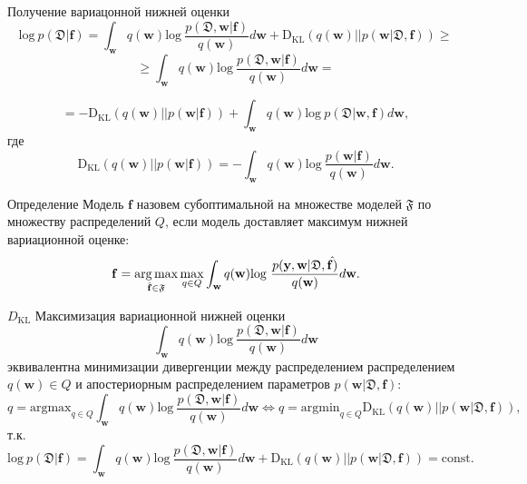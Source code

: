 \documentclass[10pt,pdf,utf8,russian,aspectratio=169]{beamer}
\DeclareMathOperator*{\argmax}{arg\,max}
\begin{document}
\begin{frame}{Получение вариацонной нижней оценки}
$$
\text{log}~p(\mathfrak{D}| \mathbf{f})  = \int_{\mathbf{w}} q(\mathbf{w})\text{log}~\frac{p(\mathfrak{D},\mathbf{w}|\mathbf{f})}{q(\mathbf{w})}d\mathbf{w} + \text{D}_\text{KL}  (q(\mathbf{w})||p(\mathbf{w}| \mathfrak{D}, \mathbf{f})) \geq	
$$
$$
\geq \int_{\mathbf{w}} q(\mathbf{w})\text{log}~\frac{p(\mathfrak{D},\mathbf{w}|\mathbf{f})}{q(\mathbf{w})}d\mathbf{w} =
$$

$$
= -\text{D}_\text{KL} (q(\mathbf{w})||p(\mathbf{w}|\mathbf{f})) + \int_{\mathbf{w}} q(\mathbf{w})\text{log}~{p(\mathfrak{D}|\mathbf{w},\mathbf{f})} d \mathbf{w},
$$
где $$\text{D}_\text{KL}(q(\mathbf{w})||p(\mathbf{w} |\mathbf{f})) = -\int_{\mathbf{w}} q(\mathbf{w})\text{log}~\frac{p(\mathbf{w} | \mathbf{f})}{q(\mathbf{w})}d\mathbf{w}.$$
\begin{block}{Определение} Модель $\mathbf{f}$ назовем субоптимальной на множестве моделей $\mathfrak{F}$  по множеству распределений ${Q}$, если модель доставляет максимум нижней вариационной оценке:
\[
\label{eq:elbo2}
	\mathbf{f} = \argmax_{\hat{\mathbf{f}} \in \mathfrak{F}}\max_{q \in {Q}}\int_{\mathbf{w}} q(\mathbf{w})\textnormal{log}~\frac{p(\mathbf{y},\mathbf{w}|\mathfrak{D},\hat{\mathbf{f})}}{q(\mathbf{w})}d\mathbf{w}.
\]
\end{block}


\end{frame}

\begin{frame}{$D_\text{KL}$}
Максимизация вариационной нижней оценки $$\int_{\mathbf{w}} q(\mathbf{w})\text{log}~\frac{p(\mathfrak{D},\mathbf{w}|\mathbf{f})}{q(\mathbf{w})}d\mathbf{w}$$   эквивалентна минимизации дивергенции между распределением распределением $q(\mathbf{w}) \in Q$ и апостериорным распределением параметров $p(\mathbf{w}|\mathfrak{D}, \mathbf{f})$:
\[
q = \text{argmax}_{q \in Q}\int_{\mathbf{w}} q(\mathbf{w})\text{log}~\frac{p(\mathfrak{D},\mathbf{w}|\mathbf{f})}{q(\mathbf{w})}d\mathbf{w} \Leftrightarrow 	
q = \text{argmin}_{q \in Q} \text{D}_\text{KL}  (q(\mathbf{w})||p(\mathbf{w}| \mathfrak{D}, \mathbf{f})),
\]
т.к.
$$\text{log}~p(\mathfrak{D}| \mathbf{f})  = \int_{\mathbf{w}} q(\mathbf{w})\text{log}~\frac{p(\mathfrak{D},\mathbf{w}|\mathbf{f})}{q(\mathbf{w})}d\mathbf{w} + \text{D}_\text{KL}  (q(\mathbf{w})||p(\mathbf{w}| \mathfrak{D}, \mathbf{f})) = \text{const}.$$



\end{frame}
\end{document}
